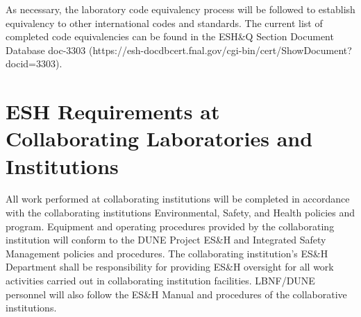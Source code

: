 As necessary, the laboratory code equivalency process will be followed
to establish equivalency to other international codes and
standards. The current list of completed code equivalencies can be
found in the ESH\&Q Section Document Database doc-3303
(https://esh-docdbcert.fnal.gov/cgi-bin/cert/ShowDocument?docid=3303).

\section{ESH Requirements at Collaborating Laboratories and Institutions}

All work performed at collaborating institutions will be completed in
accordance with the collaborating institutions Environmental, Safety,
and Health policies and program. Equipment and operating procedures
provided by the collaborating institution will conform to the DUNE
Project ES\&H and Integrated Safety Management policies and
procedures. The collaborating institution’s ES\&H Department shall be
responsibility for providing ES\&H oversight for all work activities
carried out in collaborating institution facilities. LBNF/DUNE
personnel will also follow the ES\&H Manual and procedures of the
collaborative institutions.
